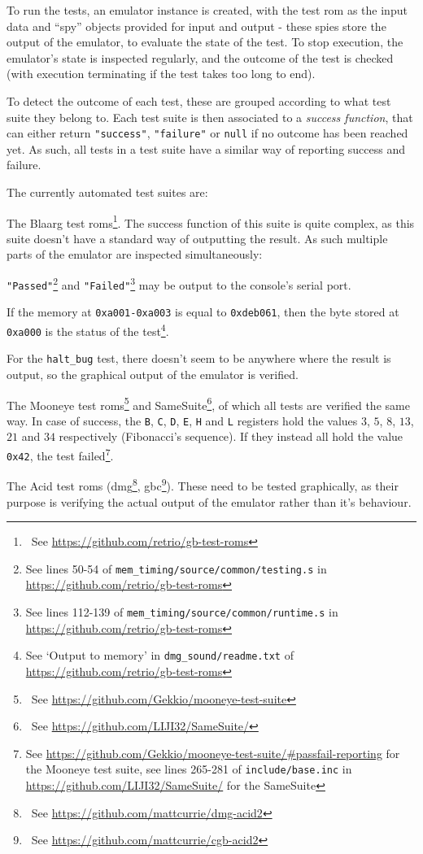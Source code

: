 \documentclass[11pt]{informatics-report}
\newcommand{\ftnt}[1]{\footnote{~See \url{#1}}}
\begin{document}
To run the tests, an emulator instance is created, with the test \gls{rom} as the input data and ``spy'' objects provided for input and output - these spies store the output of the emulator, to evaluate the state of the test. To stop execution, the emulator's state is inspected regularly, and the outcome of the test is checked (with execution terminating if the test takes too long to end).

To detect the outcome of each test, these are grouped according to what test suite they belong to. Each test suite is then associated to a \textit{success function}, that can either return \texttt{"success"}, \texttt{"failure"} or \texttt{null} if no outcome has been reached yet. As such, all tests in a test suite have a similar way of reporting success and failure.

The currently automated test suites are:
\begin{compactitem}
	\item The Blaarg test \glspl{rom}\ftnt{https://github.com/retrio/gb-test-roms}. The success function of this suite is quite complex, as this suite doesn't have a standard way of outputting the result. As such multiple parts of the emulator are inspected simultaneously:
		\begin{compactitem}
			\item \texttt{"Passed"}\footnote{See lines 50-54 of \texttt{mem\_timing/source/common/testing.s} in \url{https://github.com/retrio/gb-test-roms}} and \texttt{"Failed"}\footnote{See lines 112-139 of \texttt{mem\_timing/source/common/runtime.s} in \url{https://github.com/retrio/gb-test-roms}} may be output to the console's serial port.
			\item If the memory at \texttt{0xa001-0xa003} is equal to \texttt{0xdeb061}, then the byte stored at \texttt{0xa000} is the status of the test\footnote{See `Output to memory' in \texttt{dmg\_sound/readme.txt} of \url{https://github.com/retrio/gb-test-roms}}.
			\item For the \texttt{halt\_bug} test, there doesn't seem to be anywhere where the result is output, so the graphical output of the emulator is verified.
		\end{compactitem}
	\item The Mooneye test \glspl{rom}\ftnt{https://github.com/Gekkio/mooneye-test-suite} and SameSuite\ftnt{https://github.com/LIJI32/SameSuite/}, of which all tests are verified the same way. In case of success, the \texttt{B}, \texttt{C}, \texttt{D}, \texttt{E}, \texttt{H} and \texttt{L} registers hold the values $3$, $5$, $8$, $13$, $21$ and $34$ respectively (Fibonacci's sequence). If they instead all hold the value \texttt{0x42}, the test failed\footnote{See \url{https://github.com/Gekkio/mooneye-test-suite/\#passfail-reporting} for the Mooneye test suite, see lines 265-281 of \texttt{include/base.inc} in \url{https://github.com/LIJI32/SameSuite/} for the SameSuite}.
	\item The Acid test \glspl{rom} (\gls{dmg}\ftnt{https://github.com/mattcurrie/dmg-acid2}, \gls{gbc}\ftnt{https://github.com/mattcurrie/cgb-acid2}). These need to be tested graphically, as their purpose is verifying the actual output of the emulator rather than it's behaviour.
\end{compactitem}
\end{document}
